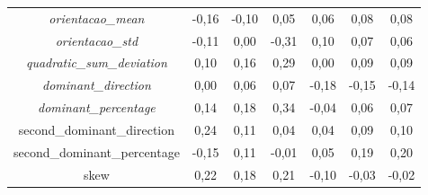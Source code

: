 \begin{spacing}{1}
\begin{table}[htb]
{\begin{tabular}{|c|ccc|ccc|}
    \textit{orientacao\_mean} & \cellcolor[HTML]{D67A5C}-0,16 & \cellcolor[HTML]{E5725F}-0,10 & \cellcolor[HTML]{F16C62}0,05 & \cellcolor[HTML]{EE6D62}0,06 & \cellcolor[HTML]{EA6F61}0,08 & \cellcolor[HTML]{EA6F61}0,08 \\
    \textit{orientacao\_std} & \cellcolor[HTML]{E4735F}-0,11 & \cellcolor[HTML]{FF6565}0,00 & \cellcolor[HTML]{B18C54}-0,31 & \cellcolor[HTML]{E37360}0,10 & \cellcolor[HTML]{ED6E62}0,07 & \cellcolor[HTML]{EE6D62}0,06 \\
    \textit{quadratic\_sum\_deviation} & \cellcolor[HTML]{E47260}0,10 & \cellcolor[HTML]{D47B5C}0,16 & \cellcolor[HTML]{AF8D55}0,29 & \cellcolor[HTML]{FE6664}0,00 & \cellcolor[HTML]{E77160}0,09 & \cellcolor[HTML]{E57260}0,09 \\
    \textit{dominant\_direction} & \cellcolor[HTML]{FF6565}0,00 & \cellcolor[HTML]{F06D62}0,06 & \cellcolor[HTML]{EC6E62}0,07 & \cellcolor[HTML]{D27C5B}-0,18 & \cellcolor[HTML]{DA785D}-0,15 & \cellcolor[HTML]{DB775D}-0,14 \\
    \textit{dominant\_percentage} & \cellcolor[HTML]{D9785D}0,14 & \cellcolor[HTML]{CE7D5B}0,18 & \cellcolor[HTML]{A19452}0,34 & \cellcolor[HTML]{F56A62}-0,04 & \cellcolor[HTML]{EE6D62}0,06 & \cellcolor[HTML]{ED6E62}0,07 \\
    second\_dominant\_direction & \cellcolor[HTML]{BD8658}0,24 & \cellcolor[HTML]{E0755F}0,11 & \cellcolor[HTML]{F56A63}0,04 & \cellcolor[HTML]{F46A63}0,04 & \cellcolor[HTML]{E57260}0,09 & \cellcolor[HTML]{E47260}0,10 \\
    second\_dominant\_percentage & \cellcolor[HTML]{D9785D}-0,15 & \cellcolor[HTML]{E1745F}0,11 & \cellcolor[HTML]{FC6764}-0,01 & \cellcolor[HTML]{F06C62}0,05 & \cellcolor[HTML]{CA805A}0,19 & \cellcolor[HTML]{C8815A}0,20 \\
    skew & \cellcolor[HTML]{C38359}0,22 & \cellcolor[HTML]{CD7E5B}0,18 & \cellcolor[HTML]{C48259}0,21 & \cellcolor[HTML]{E6725F}-0,10 & \cellcolor[HTML]{F76963}-0,03 & \cellcolor[HTML]{F96963}-0,02 \\

\end{tabular}}
\end{table}
\end{spacing}

